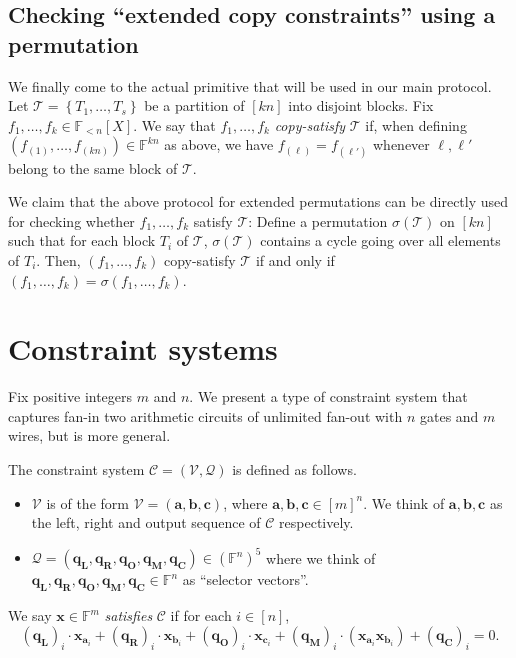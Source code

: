 \documentclass[11pt]{article} %
\newcommand{\F}{\ensuremath{\mathbb F}\xspace}
\newcommand{\sigof}[1]{\ensuremath{\sigma(#1)}\xspace}
\newcommand{\partition}{\ensuremath{{\mathcal T}}\xspace}
\newcommand{\set}[1]{\ensuremath{\left\{#1\right\}}\xspace}
\newcommand{\polysofdeg}[1]{\ensuremath{\F_{< #1}[X]}\xspace}
\newcommand{\selleft}{\ensuremath{\mathbf{q_L}}\xspace}
\newcommand{\selright}{\ensuremath{\mathbf{q_R}}\xspace}
\newcommand{\selout}{\ensuremath{\mathbf{q_O}}\xspace}
\newcommand{\selmult}{\ensuremath{\mathbf{q_M}}\xspace}
\newcommand{\selconst}{\ensuremath{\mathbf{q_C}}\xspace}
\newcommand{\selectors}{\ensuremath{\mathcal{Q}}\xspace}
\newcommand{\lvar}{\ensuremath{\mathbf{a}}\xspace}
\newcommand{\vars}{\ensuremath{\mathcal{V}}\xspace}
\newcommand{\rvar}{\ensuremath{\mathbf{b}}\xspace}
\newcommand{\ovar}{\ensuremath{\mathbf{c}}\xspace}
\newcommand{\assignment}{\ensuremath{\mathbf{x}}\xspace}
\newcommand{\constsystem}{\ensuremath{\mathscr{C}}\xspace}
\newtheorem{claim}[lemma]{Claim}
\begin{document}
\subsection{Checking ``extended copy constraints'' using a permutation}\label{subsec:copychecks}
We finally come to the actual primitive that will be used in our main protocol.
Let $\partition= \set{T_1,\ldots,T_s}$ be a partition of $[kn]$ into disjoint blocks.
Fix $f_1,\ldots,f_k\in \polysofdeg{n}$.
We say that $f_1,\ldots,f_k$ \emph{copy-satisfy} \partition if, when defining $(f_{(1)},\ldots,f_{(kn)})\in \F^{kn}$ as above, we have 
$f_{(\ell)} = f_{(\ell')}$ whenever $\ell,\ell'$ belong to the same block
 of \partition.

 
 
We claim that the above protocol for extended permutations can be directly used for checking whether $f_1,\ldots,f_k$ satisfy \partition:
Define a permutation $\sigof{\partition}$ on $[kn]$ such that for each block $T_i$ of \partition, $\sigof{\partition}$ contains a cycle going over all elements of $T_i$.
Then, $(f_1,\ldots,f_k)$ copy-satisfy \partition if and only if 
$(f_1,\ldots,f_k) = \sigma(f_1,\ldots,f_k)$.


\section{Constraint systems}\label{sec:constsystems}
Fix positive integers $m$ and $n$.
We present a type of constraint system that captures fan-in two arithmetic circuits of unlimited fan-out with $n$ gates and $m$ wires, but is more general.

The constraint system $\constsystem=(\vars,\selectors)$ is defined as follows.
\begin{itemize}
 \item \vars is of the form $\vars=(\lvar,\rvar,\ovar)$,  where $\lvar,\rvar,\ovar \in [m]^n$. We think of $\lvar,\rvar,\ovar$ as the left, right and output sequence of \constsystem respectively.
\item $\selectors = (\selleft,\selright,\selout,\selmult,\selconst)\in (\F^n)^5$ where we think of $\selleft,\selright,\selout,\selmult,\selconst \in \F^n$ as ``selector vectors''.
\end{itemize}
We say $\assignment \in \F^{m}$ \emph{satisfies} \constsystem if for each $i\in [n]$,
\[(\selleft)_i\cdot \assignment_{\lvar_i} + (\selright)_i \cdot \assignment_{\rvar_i} + (\selout)_i \cdot \assignment_{\ovar_i} + (\selmult)_i\cdot (\assignment_{\lvar_i}\assignment_{\rvar_i}) + (\selconst)_i =0.\]
\end{document}
